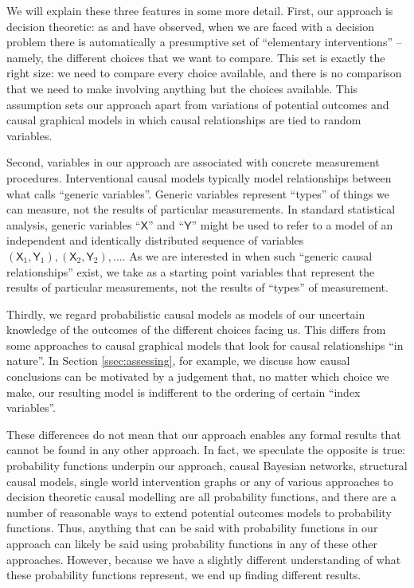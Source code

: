 \documentclass{article}
\theoremstyle{plain}
\theoremstyle{definition}
\newcommand{\RV}[1]{\ensuremath{\mathsf{#1}}}
\begin{document}
We will explain these three features in some more detail. First, our approach is decision theoretic: as \citet{dawid_decision-theoretic_2020} and \citet{heckerman_decision-theoretic_1995} have observed, when we are faced with a decision problem there is automatically a presumptive set of ``elementary interventions'' -- namely, the different choices that we want to compare. This set is exactly the right size: we need to compare every choice available, and there is no comparison that we need to make involving anything but the choices available. This assumption sets our approach apart from variations of potential outcomes and causal graphical models in which causal relationships are tied to random variables.

Second, variables in our approach are associated with concrete measurement procedures. Interventional causal models typically model relationships between what \citet{dawid_decision-theoretic_2020} calls ``generic variables''. Generic variables represent ``types'' of things we can measure, not the results of particular measurements. In standard statistical analysis, generic variables ``$\RV{X}$'' and ``$\RV{Y}$'' might be used to refer to a model of an independent and identically distributed sequence of variables $(\RV{X}_1,\RV{Y}_1),(\RV{X}_2,\RV{Y}_2),...$. As we are interested in when such ``generic causal relationships'' exist, we take as a starting point variables that represent the results of particular measurements, not the results of ``types'' of measurement.

Thirdly, we regard probabilistic causal models as models of our uncertain knowledge of the outcomes of the different choices facing us. This differs from some approaches to causal graphical models that look for causal relationships ``in nature''. In Section \ref{ssec:assessing}, for example, we discuss how causal conclusions can be motivated by a judgement that, no matter which choice we make, our resulting model is indifferent to the ordering of certain ``index variables''.

These differences do not mean that our approach enables any formal results that cannot be found in any other approach. In fact, we speculate the opposite is true: probability functions underpin our approach, causal Bayesian networks, structural causal models, single world intervention graphs or any of various approaches to decision theoretic causal modelling are all probability functions, and there are a number of reasonable ways to extend potential outcomes models to probability functions. Thus, anything that can be said with probability functions in our approach can likely be said using probability functions in any of these other approaches. However, because we have a slightly different understanding of what these probability functions represent, we end up finding different results.
\end{document}
